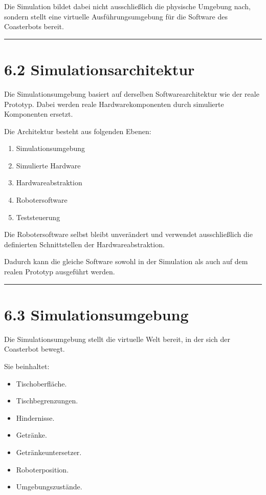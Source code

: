 \documentclass[
]{article}
\providecommand{\tightlist}{%
  \setlength{\itemsep}{0pt}\setlength{\parskip}{0pt}}
\begin{document}
Die Simulation bildet dabei nicht ausschließlich die physische Umgebung
nach, sondern stellt eine virtuelle Ausführungsumgebung für die Software
des Coasterbots bereit.

\begin{center}\rule{0.5\linewidth}{0.5pt}\end{center}

\section{6.2 Simulationsarchitektur}\label{simulationsarchitektur-1}

Die Simulationsumgebung basiert auf derselben Softwarearchitektur wie
der reale Prototyp. Dabei werden reale Hardwarekomponenten durch
simulierte Komponenten ersetzt.

Die Architektur besteht aus folgenden Ebenen:

\begin{enumerate}
\def\labelenumi{\arabic{enumi}.}
\tightlist
\item
  Simulationsumgebung
\item
  Simulierte Hardware
\item
  Hardwareabstraktion
\item
  Robotersoftware
\item
  Teststeuerung
\end{enumerate}

Die Robotersoftware selbst bleibt unverändert und verwendet
ausschließlich die definierten Schnittstellen der Hardwareabstraktion.

Dadurch kann die gleiche Software sowohl in der Simulation als auch auf
dem realen Prototyp ausgeführt werden.

\begin{center}\rule{0.5\linewidth}{0.5pt}\end{center}

\section{6.3 Simulationsumgebung}\label{simulationsumgebung}

Die Simulationsumgebung stellt die virtuelle Welt bereit, in der sich
der Coasterbot bewegt.

Sie beinhaltet:

\begin{itemize}
\tightlist
\item
  Tischoberfläche.
\item
  Tischbegrenzungen.
\item
  Hindernisse.
\item
  Getränke.
\item
  Getränkeuntersetzer.
\item
  Roboterposition.
\item
  Umgebungszustände.
\end{itemize}
\end{document}
